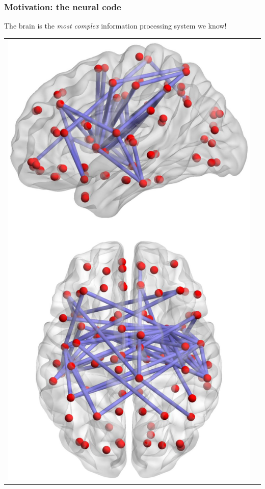 \documentclass{beamer}
\begin{document}
\begin{frame}
\frametitle{Motivation: the neural code}
The brain is the \emph{most complex} information processing system we know!
\vspace{0.3in}
\begin{center}
\begin{tabular}{cc}
\includegraphics[scale = 0.3, clip =true, trim=0 0 0 2.5in]{Brain_network.png} &

\end{tabular}
\end{center}
\end{frame}
\end{document}
